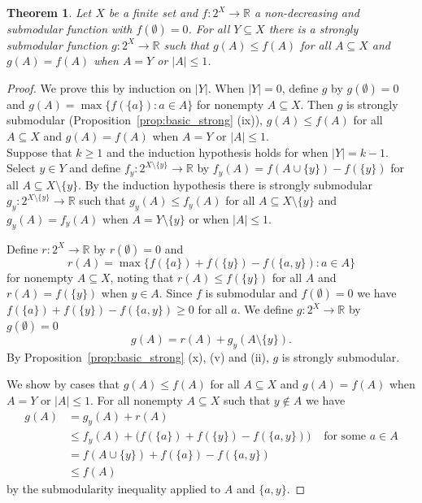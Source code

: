 \documentclass{article}
\theoremstyle{plain}
\newtheorem{theorem}{Theorem}
\theoremstyle{definition}
\renewcommand{\Re}{\mathbb{R}}
\begin{document}
 \begin{theorem} \label{thm:submodular_match}
 Let $X$ be a finite set and $f:2^X \rightarrow \Re$ a non-decreasing and  submodular function with $f(\emptyset) = 0$. For all  $Y \subseteq X$ there is a strongly submodular function $g:2^X \rightarrow \Re$ such that $g(A) \leq f(A)$ for all $A \subseteq X$ and $g(A) = f(A)$ when $A =Y$ or $|A| \leq 1$. 
 \end{theorem}
 \begin{proof}
 We prove this by induction on $|Y|$.  When $|Y| = 0$, define $g$ by $g(\emptyset) = 0$ and $g(A)  = \max\{f(\{a\}): a \in A\}$ for nonempty $A \subseteq X$. Then $g$ is strongly submodular (Proposition~\ref{prop:basic_strong} (ix)),  $g(A) \leq f(A)$ for all $A \subseteq X$ and  $g(A) = f(A)$ when $A =Y$ or $|A| \leq 1$. \\
  
 Suppose that $k \geq 1$ and the induction hypothesis holds for when $|Y| = k-1$. Select $y \in Y$ and define $f_y:2^{X \setminus \{y\}} \rightarrow \Re$ by $f_y(A) = f(A \cup \{y\}) - f(\{y\})$ for all $A \subseteq X \setminus \{y\}$. By the induction hypothesis there is strongly submodular $g_y:2^{X \setminus \{y\}} \rightarrow \Re$ such that $g_y(A) \leq f_y(A)$ for all $A \subseteq X \setminus \{y\}$ and $g_y(A) = f_y(A)$ when $A =  Y \setminus \{y\}$ or when $|A| \leq 1$. 
 
Define $r: 2^X \rightarrow \Re$ by $r(\emptyset) = 0$ and 
\[r(A) = \max \{ f(\{a\}) + f(\{y\}) - f(\{a,y\}) :  a \in A\}\]
for nonempty $A \subseteq X$, noting that $r(A) \leq f(\{y\})$ for all $A$ and $r(A) = f(\{y\})$ when $y \in A$. Since $f$ is submodular and $f(\emptyset) = 0$ we have $f(\{a\}) + f(\{y\}) - f(\{a,y\}) \geq 0$ for all $a$.  We define $g:2^X \rightarrow \Re$ by $g(\emptyset) = 0$
 \[g(A) = r(A) + g_y(A \setminus \{y\}).\]
 By Proposition~\ref{prop:basic_strong} (x), (v) and (ii), $g$ is strongly submodular.
  
We show by cases that $g(A) \leq f(A)$ for all $A \subseteq X$ and $g(A) = f(A)$ when $A =Y$ or $|A| \leq 1$.  
For all nonempty $A \subseteq X$ such that $y \not \in A$  we have
 \begin{align*}
 g(A) & = g_y(A) + r(A) \\
 & \leq f_y(A) + \big(f(\{a\}) + f(\{y\}) - f(\{a,y\}) \big)& \mbox{ for some $a \in A$}\\
  & = f(A \cup \{y\}) + f(\{a\})  - f(\{a,y\}) \\
  & \leq f(A)
  \end{align*}
  by the submodularity inequality applied to $A$ and $\{a,y\}$. 
  

\end{proof}
\end{document}

